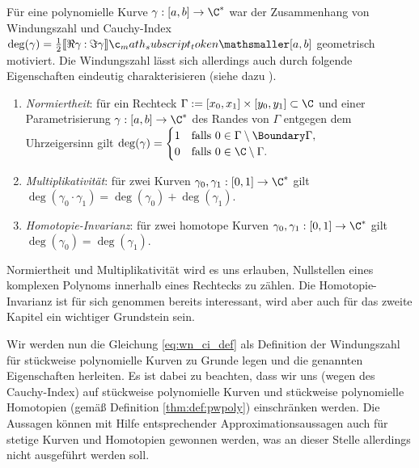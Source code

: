 \documentclass{mythesis}
\begin{document}
Für eine polynomielle Kurve $\gamma: [a,b] \to \C^*$ war der Zusammenhang von Windungszahl und Cauchy-Index
\begin{math}[numbered] \label{eq:wn_ci_def}
    \deg(\gamma) = \frac{1}{2} \Index{[a,b]}{\Re \gamma}{\Im \gamma}
\end{math}
geometrisch motiviert.
Die Windungszahl lässt sich allerdings auch durch folgende Eigenschaften eindeutig charakterisieren (siehe dazu \cite[Theorem 5.13, (3)]{eisermann2012fundamental}).
\begin{enumerate}[(W1),leftmargin=3.5em]
    \item
        \emph{Normiertheit}: für ein Rechteck $\Gamma := [x_0, x_1] \times [y_0, y_1] \subset \C$ und einer Parametrisierung $\gamma: [a,b] \to \C^*$ des Randes von $\Gamma$ entgegen dem Uhrzeigersinn gilt
        \begin{math}
            \deg(\gamma) = \begin{cases}
                1 & \text{falls $0 \in \Gamma \setminus \Boundary\Gamma$}, \\
                0 & \text{falls $0 \in \C \setminus \Gamma$}.
            \end{cases}
        \end{math}
    \item
        \emph{Multiplikativität}: für zwei Kurven $\gamma_0, \gamma_1: [0,1] \to \C^*$ gilt
        \begin{math}
            \deg(\gamma_0 \cdot \gamma_1) = \deg(\gamma_0) + \deg(\gamma_1).
        \end{math}
    \item
        \emph{Homotopie-Invarianz}: für zwei homotope Kurven $\gamma_0, \gamma_1: [0,1] \to \C^*$ gilt
        \begin{math}
            \deg(\gamma_0) = \deg(\gamma_1).
        \end{math}
\end{enumerate}
Normiertheit und Multiplikativität wird es uns erlauben, Nullstellen eines komplexen Polynoms innerhalb eines Rechtecks zu zählen.
Die Homotopie-Invarianz ist für sich genommen bereits interessant, wird aber auch für das zweite Kapitel ein wichtiger Grundstein sein.

Wir werden nun die Gleichung \eqref{eq:wn_ci_def} als Definition der Windungszahl für stückweise polynomielle Kurven zu Grunde legen und die genannten Eigenschaften herleiten.
Es ist dabei zu beachten, dass wir uns (wegen des Cauchy-Index) auf stückweise polynomielle Kurven und stückweise polynomielle Homotopien (gemäß Definition \ref{thm:def:pwpoly}) einschränken werden.
Die Aussagen können mit Hilfe entsprechender Approximationsaussagen auch für stetige Kurven und Homotopien gewonnen werden, was an dieser Stelle allerdings nicht ausgeführt werden soll.
\end{document}
